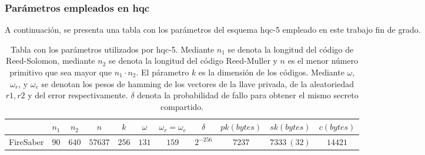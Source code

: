 \subsubsection{Parámetros empleados en \acrshort{hqc}}
A continuación, se presenta una tabla con los parámetros del esquema \acrshort{hqc}-5 empleado en este trabajo fin de grado.
\begin{table}[H]
	\centering
	\renewcommand{\arraystretch}{1.2}
	\begin{tabular}{lcccccccccc}
		\hline
		&\(n_1\)&\(n_2\)&\(n\)&\(k\)&\(\omega\)&\(\omega_r=\omega_e\)&\(\delta\)&\(pk (bytes)\)&\(sk (bytes)\)&\(c (bytes)\)\\
		\hline
		FireSaber&\(90\)&\(640\)&\(57637\)&\(256\)&\(131\)&\(159\)&\(2^{-256}\)&\(7237\)&\(7333 \ (32)\)&\(14421\)\\
		\hline
	\end{tabular}
	\caption{Tabla con los parámetros utilizados por \acrshort{hqc}-5. Mediante \(n_1\) se denota la longitud del código de Reed-Solomon, mediante \(n_2\) se denota la longitud del código Reed-Muller y \(n\) es el menor número primitivo que sea mayor que \(n_1\cdot n_2\). El párametro \(k\) es la dimensión de los códigos. Mediante $\omega$, $\omega_r$, y $\omega_e$ se denotan los pesos de hamming de los vectores de la llave privada, de la aleatoriedad \(r1,r2\) y del error respectivamente. $\delta$ denota la probabilidad de fallo para obtener el mismo secreto compartido.}
	\label{tab:HQCParams}
\end{table}
